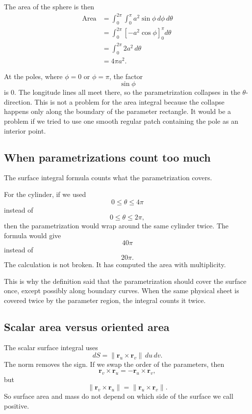 The area of the sphere is then
\[
\begin{aligned}
    \operatorname{Area}
    &=
    \int_0^{2\pi}\int_0^\pi
    a^2\sin\phi\,d\phi\,d\theta\\
    &=
    \int_0^{2\pi}
    \left[-a^2\cos\phi\right]_0^\pi
    d\theta\\
    &=
    \int_0^{2\pi}2a^2\,d\theta\\
    &=
    4\pi a^2.
\end{aligned}
\]

At the poles, where \(\phi=0\) or \(\phi=\pi\), the factor
\[
    \sin\phi
\]
is \(0\).  The longitude lines all meet there, so the parametrization collapses in the
\(\theta\)-direction.  This is not a problem for the area integral because the collapse
happens only along the boundary of the parameter rectangle.  It would be a problem if
we tried to use one smooth regular patch containing the pole as an interior point.

\subsection{When parametrizations count too much}

The surface integral formula counts what the parametrization covers.

For the cylinder, if we used
\[
    0\le\theta\le4\pi
\]
instead of
\[
    0\le\theta\le2\pi,
\]
then the parametrization would wrap around the same cylinder twice.  The formula
would give
\[
    40\pi
\]
instead of
\[
    20\pi.
\]
The calculation is not broken.  It has computed the area with multiplicity.

This is why the definition said that the parametrization should cover the surface once,
except possibly along boundary curves.  When the same physical sheet is covered twice
by the parameter region, the integral counts it twice.

\subsection{Scalar area versus oriented area}

The scalar surface integral uses
\[
    dS=\|\mathbf r_u\times\mathbf r_v\|\,du\,dv.
\]
The norm removes the sign.  If we swap the order of the parameters, then
\[
    \mathbf r_v\times\mathbf r_u
    =
    -\mathbf r_u\times\mathbf r_v,
\]
but
\[
    \|\mathbf r_v\times\mathbf r_u\|
    =
    \|\mathbf r_u\times\mathbf r_v\|.
\]
So surface area and mass do not depend on which side of the surface we call positive.

